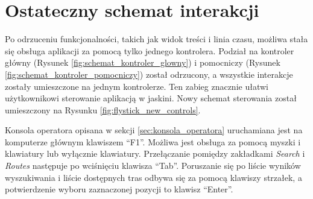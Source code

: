 \section{Ostateczny schemat interakcji}
\label{sec:schemat_interakcji}
Po odrzuceniu funkcjonalności, takich jak widok treści i linia czasu, możliwa stała się obsługa aplikacji za pomocą tylko jednego kontrolera. Podział na kontroler główny (Rysunek \ref{fig:schemat_kontroler_glowny}) i pomocniczy (Rysunek \ref{fig:schemat_kontroler_pomocniczy}) został odrzucony, a wszystkie interakcje zostały umieszczone na jednym kontrolerze. Ten zabieg znacznie ułatwi użytkownikowi sterowanie aplikacją w jaskini. Nowy schemat sterowania został umieszczony na Rysunku \ref{fig:flystick_new_controls}.


Konsola operatora opisana w sekcji \ref{sec:konsola_operatora} uruchamiana jest na komputerze głównym klawiszem ``F1''. Możliwa jest obsługa za pomocą myszki i klawiatury lub wyłącznie klawiatury. Przełączanie pomiędzy zakładkami \textit{Search} i \textit{Routes} następuje po wciśnięciu klawisza ``Tab''. Poruszanie się po liście wyników wyszukiwania i liście dostępnych tras odbywa się za pomocą klawiszy strzałek, a potwierdzenie wyboru zaznaczonej pozycji to klawisz ``Enter''.